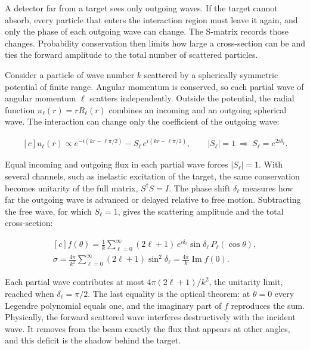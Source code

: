 \documentclass[11pt,oneside]{book}
\newenvironment{centeredalign}{\[\begin{gathered}[c]}{\end{gathered}\]}
\begin{document}
\label{topic:s-matrix}

A detector far from a target sees only outgoing waves. If the target cannot absorb, every particle that enters the interaction region must leave it again, and only the phase of each outgoing wave can change. The S-matrix records those changes. Probability conservation then limits how large a cross-section can be and ties the forward amplitude to the total number of scattered particles.

Consider a particle of wave number \(k\) scattered by a spherically symmetric potential of finite range. Angular momentum is conserved, so each partial wave of angular momentum \(\ell\) scatters independently. Outside the potential, the radial function \(u_\ell(r)=rR_\ell(r)\) combines an incoming and an outgoing spherical wave. The interaction can change only the coefficient of the outgoing wave:

\begin{centeredalign}
u_\ell(r)\propto e^{-i(kr-\ell\pi/2)}-S_\ell\,e^{i(kr-\ell\pi/2)},\qquad
|S_\ell|=1\ \Rightarrow\ S_\ell=e^{2i\delta_\ell}.
\end{centeredalign}

Equal incoming and outgoing flux in each partial wave forces \(|S_\ell|=1\). With several channels, such as inelastic excitation of the target, the same conservation becomes unitarity of the full matrix, \(S^\dagger S=I\). The phase shift \(\delta_\ell\) measures how far the outgoing wave is advanced or delayed relative to free motion. Subtracting the free wave, for which \(S_\ell=1\), gives the scattering amplitude and the total cross-section:

\begin{centeredalign}
f(\theta)=\frac1k\sum_{\ell=0}^\infty(2\ell+1)\,e^{i\delta_\ell}\sin\delta_\ell\,P_\ell(\cos\theta),\\
\sigma=\frac{4\pi}{k^2}\sum_{\ell=0}^\infty(2\ell+1)\sin^2\delta_\ell=\frac{4\pi}{k}\operatorname{Im}f(0).
\end{centeredalign}

Each partial wave contributes at most \(4\pi(2\ell+1)/k^2\), the unitarity limit, reached when \(\delta_\ell=\pi/2\). The last equality is the optical theorem: at \(\theta=0\) every Legendre polynomial equals one, and the imaginary part of \(f\) reproduces the sum. Physically, the forward scattered wave interferes destructively with the incident wave. It removes from the beam exactly the flux that appears at other angles, and this deficit is the shadow behind the target.
\end{document}
